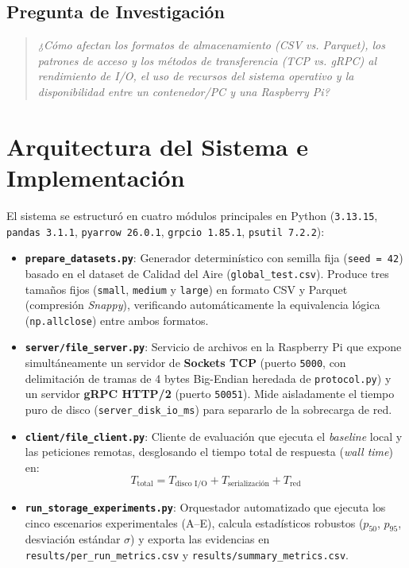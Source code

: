 \documentclass[11pt,a4paper]{article}
\begin{document}
\subsection{Pregunta de Investigación}
\begin{quote}
\textit{¿Cómo afectan los formatos de almacenamiento (CSV vs. Parquet), los patrones de acceso y los métodos de transferencia (TCP vs. gRPC) al rendimiento de I/O, el uso de recursos del sistema operativo y la disponibilidad entre un contenedor/PC y una Raspberry Pi?}
\end{quote}

\section{Arquitectura del Sistema e Implementación}

El sistema se estructuró en cuatro módulos principales en Python (\texttt{3.13.15}, \texttt{pandas 3.1.1}, \texttt{pyarrow 26.0.1}, \texttt{grpcio 1.85.1}, \texttt{psutil 7.2.2}):
\begin{itemize}
    \item \textbf{\texttt{prepare\_datasets.py}}: Generador determinístico con semilla fija (\texttt{seed = 42}) basado en el dataset de Calidad del Aire (\texttt{global\_test.csv}). Produce tres tamaños fijos (\texttt{small}, \texttt{medium} y \texttt{large}) en formato CSV y Parquet (compresión \textit{Snappy}), verificando automáticamente la equivalencia lógica (\texttt{np.allclose}) entre ambos formatos.
    \item \textbf{\texttt{server/file\_server.py}}: Servicio de archivos en la Raspberry Pi que expone simultáneamente un servidor de \textbf{Sockets TCP} (puerto \texttt{5000}, con delimitación de tramas de 4 bytes Big-Endian heredada de \texttt{protocol.py}) y un servidor \textbf{gRPC HTTP/2} (puerto \texttt{50051}). Mide aisladamente el tiempo puro de disco (\texttt{server\_disk\_io\_ms}) para separarlo de la sobrecarga de red.
    \item \textbf{\texttt{client/file\_client.py}}: Cliente de evaluación que ejecuta el \textit{baseline} local y las peticiones remotas, desglosando el tiempo total de respuesta (\textit{wall time}) en:
    \[
        T_{\text{total}} = T_{\text{disco I/O}} + T_{\text{serialización}} + T_{\text{red}}
    \]
    \item \textbf{\texttt{run\_storage\_experiments.py}}: Orquestador automatizado que ejecuta los cinco escenarios experimentales (A--E), calcula estadísticos robustos ($p_{50}$, $p_{95}$, desviación estándar $\sigma$) y exporta las evidencias en \texttt{results/per\_run\_metrics.csv} y \texttt{results/summary\_metrics.csv}.
\end{itemize}
\end{document}
